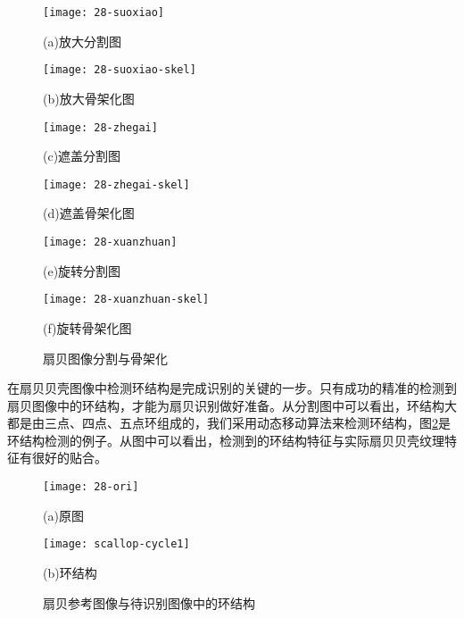 \begin{figure}
\centering
  \begin{minipage}[b]{0.48\textwidth} 
      \centering 
      \texttt{[image: 28-suoxiao]}
        \centerline{(a)放大分割图}\medskip
    \end{minipage}
  \begin{minipage}[b]{0.48\textwidth}
    \centering
    \texttt{[image: 28-suoxiao-skel]}
      \centerline{(b)放大骨架化图}\medskip
    \end{minipage}
  \begin{minipage}[b]{0.48\textwidth} 
      \centering 
      \texttt{[image: 28-zhegai]}
        \centerline{(c)遮盖分割图}\medskip
    \end{minipage}
  \begin{minipage}[b]{0.48\textwidth}
    \centering
    \texttt{[image: 28-zhegai-skel]}
      \centerline{(d)遮盖骨架化图}\medskip
  \end{minipage}
  \begin{minipage}[b]{0.48\textwidth} 
      \centering 
      \texttt{[image: 28-xuanzhuan]}
        \centerline{(e)旋转分割图}\medskip
    \end{minipage}
  \begin{minipage}[b]{0.48\textwidth}
    \centering
    \texttt{[image: 28-xuanzhuan-skel]}
      \centerline{(f)旋转骨架化图}\medskip
  \end{minipage}
\caption{扇贝图像分割与骨架化}
\label{fig:seg-skel}
\end{figure}

在扇贝贝壳图像中检测环结构是完成识别的关键的一步。只有成功的精准的检测到扇贝图像中的环结构，才能为扇贝识别做好准备。从分割图中可以看出，环结构大都是由三点、四点、五点环组成的，我们采用动态移动算法来检测环结构，图\ref{fig:scallop-cycle}是环结构检测的例子。从图中可以看出，检测到的环结构特征与实际扇贝贝壳纹理特征有很好的贴合。

\begin{figure}
\centering
  \begin{minipage}[b]{0.48\textwidth} 
      \centering 
      \texttt{[image: 28-ori]}
        \centerline{(a)原图}\medskip
    \end{minipage}
  \begin{minipage}[b]{0.48\textwidth}
    \centering
    \texttt{[image: scallop-cycle1]}
      \centerline{(b)环结构}\medskip
    \end{minipage}
\caption{扇贝参考图像与待识别图像中的环结构}
\label{fig:scallop-cycle}
\end{figure}


